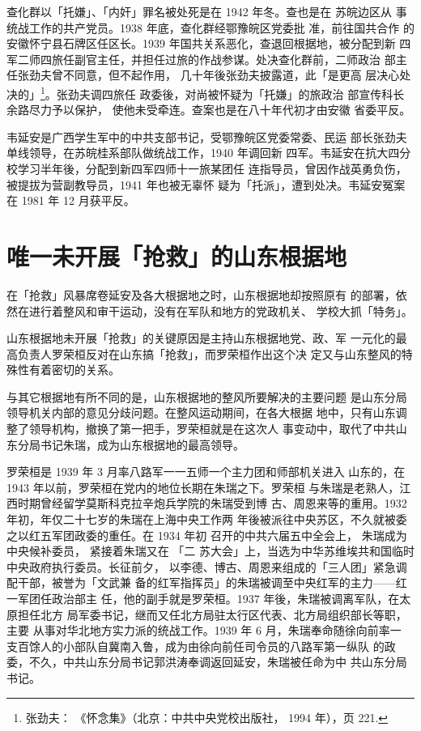 查化群以「托嫌」、「内奸」罪名被处死是在 1942 年冬。查也是在 苏皖边区从
事统战工作的共产党员。1938 年底，查化群经鄂豫皖区党委批 准，前往国共合作
的安徽怀宁县石牌区任区长。1939 年国共关系恶化，查退回根据地，被分配到新
四军二师四旅任副官主任，并担任过旅的作战参谋。处决查化群前，二师政治
部主任张劲夫曾不同意，但不起作用， 几十年後张劲夫披露道，此「是更高
层决心处决的」\footnote{张劲夫： 《怀念集》（北京：中共中央党校出版社，
1994 年），页 221.}。张劲夫调四旅任 政委後，对尚被怀疑为「托嫌」的旅政治
部宣传科长余路尽力予以保护， 使他未受牵连。查案也是在八十年代初才由安徽
省委平反。

韦延安是广西学生军中的中共支部书记，受鄂豫皖区党委常委、民运
部长张劲夫单线领导，在苏皖桂系部队做统战工作，1940 年调回新
四军。韦延安在抗大四分校学习半年後，分配到新四军四师十一旅某团任
连指导员，曾因作战英勇负伤，被提拔为营副教导员，1941 年也被无辜怀
疑为「托派」，遭到处决。韦延安冤案在 1981 年 12 月获平反。

\section{唯一未开展「抢救」的山东根据地}

在「抢救」风暴席卷延安及各大根据地之时，山东根据地却按照原有
的部署，依然在进行着整风和审干运动，没有在军队和地方的党政机关、
学校大抓「特务」。

山东根据地未开展「抢救」的关键原因是主持山东根据地党、政、军
一元化的最高负责人罗荣桓反对在山东搞「抢救」，而罗荣桓作出这个决
定又与山东整风的特殊性有着密切的关系。

与其它根据地有所不同的是，山东根据地的整风所要解决的主要问题
是山东分局领导机关内部的意见分歧问题。在整风运动期间，在各大根据
地中，只有山东调整了领导机构，撤换了第一把手，罗荣桓就是在这次人
事变动中，取代了中共山东分局书记朱瑞，成为山东根据地的最高领导。

罗荣桓是 1939 年 3 月率八路军一一五师一个主力团和师部机关进入
山东的，在 1943 年以前，罗荣桓在党内的地位长期在朱瑞之下。罗荣桓
与朱瑞是老熟人，江西时期曾经留学莫斯科克拉辛炮兵学院的朱瑞受到博
古、周恩来等的重用。1932 年初，年仅二十七岁的朱瑞在上海中央工作两
年後被派往中央苏区，不久就被委之以红五军团政委的重任。在 1934 年初
召开的中共六届五中全会上，
朱瑞成为中央候补委员，
紧接着朱瑞又在
「二
苏大会」上，当选为中华苏维埃共和国临时中央政府执行委员。长征前夕，
以李德、博古、周恩来组成的「三人团」紧急调配干部，被誉为「文武兼
备的红军指挥员」的朱瑞被调至中央红军的主力——红一军团任政治部主
任，他的副手就是罗荣桓。1937 年後，朱瑞被调离军队，在太原担任北方
局军委书记，继而又任北方局驻太行区代表、北方局组织部长等职，主要
从事对华北地方实力派的统战工作。1939 年 6 月，朱瑞奉命随徐向前率一
支百馀人的小部队自冀南入鲁，成为由徐向前任司令员的八路军第一纵队
的政委，不久，中共山东分局书记郭洪涛奉调返回延安，朱瑞被任命为中
共山东分局书记。

